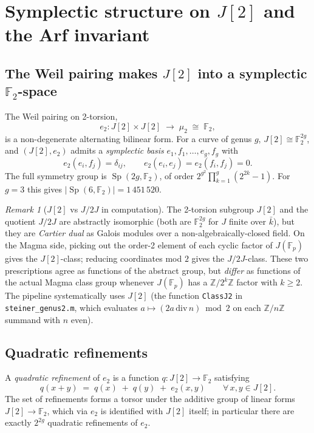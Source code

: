 \documentclass[11pt]{amsart}
\theoremstyle{plain}
\theoremstyle{definition}
\theoremstyle{remark}
\newtheorem{remark}[theorem]{Remark}
\newcommand{\Sp}{\operatorname{Sp}}
\newcommand{\F}{\mathbb F}
\newcommand{\Z}{\mathbb Z}
\begin{document}
\section{Symplectic structure on $J[2]$ and the Arf invariant}
\label{sec:arf}

\subsection{The Weil pairing makes $J[2]$ into a symplectic $\F_2$-space}

The Weil pairing on 2-torsion,
\[
  e_2 \colon J[2] \times J[2] \;\longrightarrow\; \mu_2 \;\cong\; \F_2,
\]
is a non-degenerate alternating bilinear form. For a curve of genus $g$,
$J[2] \cong \F_2^{2g}$, and $(J[2], e_2)$ admits a \emph{symplectic basis}
$e_1, f_1, \ldots, e_g, f_g$ with
\[
  e_2(e_i, f_j) = \delta_{ij}, \qquad e_2(e_i, e_j) = e_2(f_i, f_j) = 0.
\]
The full symmetry group is $\Sp(2g, \F_2)$, of order
$2^{g^2}\prod_{k=1}^{g}(2^{2k} - 1)$. For $g = 3$ this gives
$|\Sp(6, \F_2)| = 1\,451\,520$.

\begin{remark}[{$J[2]$ vs $J/2J$ in computation}]\label{rem:J2-vs-J/2J}
The 2-torsion subgroup $J[2]$ and the quotient $J/2J$ are abstractly
isomorphic (both are $\F_2^{2g}$ for $J$ finite over $\bar k$), but they are
\emph{Cartier dual} as Galois modules over a non-algebraically-closed field.
On the Magma side, picking out the order-2 element of each cyclic factor of
$J(\F_p)$ gives the $J[2]$-class; reducing coordinates mod $2$ gives the
$J/2J$-class. These two prescriptions agree as functions of the abstract
group, but \emph{differ} as functions of the actual Magma class group whenever
$J(\F_p)$ has a $\Z/2^k\Z$ factor with $k \ge 2$. The pipeline systematically
uses $J[2]$ (the function \texttt{ClassJ2} in \texttt{steiner\_genus2.m},
which evaluates $a \mapsto (2a \,\mathrm{div}\, n) \bmod 2$ on each
$\Z/n\Z$ summand with $n$ even).
\end{remark}

\subsection{Quadratic refinements}

A \emph{quadratic refinement} of $e_2$ is a function
$q \colon J[2] \to \F_2$ satisfying
\[
  q(x + y) \;=\; q(x) \;+\; q(y) \;+\; e_2(x, y) \qquad
  \forall\, x, y \in J[2].
\]
The set of refinements forms a torsor under the additive group of linear
forms $J[2] \to \F_2$, which via $e_2$ is identified with $J[2]$ itself; in
particular there are exactly $2^{2g}$ quadratic refinements of $e_2$.
\end{document}
